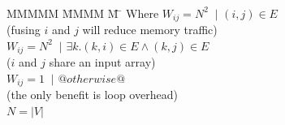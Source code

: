\begin{tabbing}
\\[1ex]
MMMMM   \= MMMM \= M \= \kill
Where      \> $W_{ij} = N^2$ \> $~|$ \> $(i,j) \in E $         \\
           \> \> \> (fusing $i$ and $j$ will reduce memory traffic)         \\
           \> $W_{ij} = N^2$ \> $~|$ \> $\exists k. (k,i) \in E \wedge (k,j) \in E $     \\
           \> \> \> ($i$ and $j$ share an input array)                                         \\
           \> $W_{ij} = 1$   \> $~|$ \> $@otherwise@$                                                  \\
           \> \> \> (the only benefit is loop overhead)                                        
\\
           \> $N = |V|$
\end{tabbing}

% 
